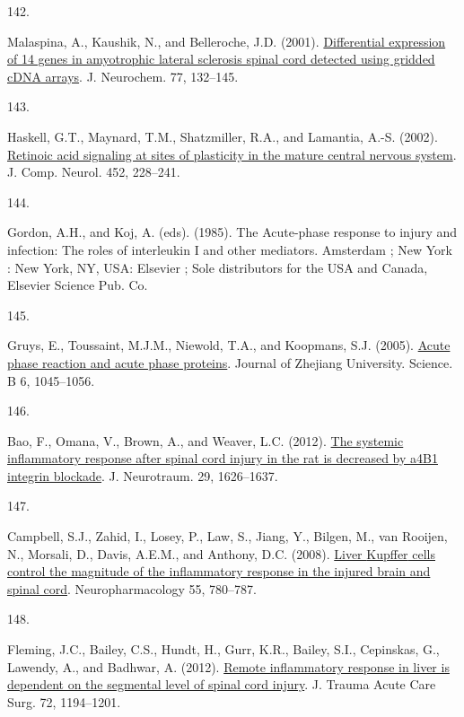 \documentclass[
]{article}
\newlength{\cslhangindent}
\newlength{\csllabelwidth}
\newlength{\cslentryspacingunit} %
\newenvironment{CSLReferences}[2] %
 {%
  \setlength{\parindent}{0pt}
  \ifodd #1
  \let\oldpar\par
  \def\par{\hangindent=\cslhangindent\oldpar}
  \fi
  \setlength{\parskip}{#2\cslentryspacingunit}
 }%
 {}
\newcommand{\CSLLeftMargin}[1]{\parbox[t]{\csllabelwidth}{#1}}
\newcommand{\CSLRightInline}[1]{\parbox[t]{\linewidth - \csllabelwidth}{#1}\break}
\begin{document}
\begin{CSLReferences}{0}{0}
\leavevmode{}%
\CSLLeftMargin{142. }
\CSLRightInline{Malaspina, A., Kaushik, N., and Belleroche, J.D. (2001). \href{https://doi.org/10.1046/j.1471-4159.2001.00231.x}{Differential expression of 14 genes in amyotrophic lateral sclerosis spinal cord detected using gridded {cDNA} arrays}. J. Neurochem. 77, 132--145.}

\leavevmode{}%
\CSLLeftMargin{143. }
\CSLRightInline{Haskell, G.T., Maynard, T.M., Shatzmiller, R.A., and Lamantia, A.-S. (2002). \href{https://doi.org/10.1002/cne.10369}{Retinoic acid signaling at sites of plasticity in the mature central nervous system}. J. Comp. Neurol. 452, 228--241.}

\leavevmode{}%
\CSLLeftMargin{144. }
\CSLRightInline{Gordon, A.H., and Koj, A. (eds). (1985). The {Acute-phase} response to injury and infection: The roles of interleukin {I} and other mediators. {Amsterdam ; New York : New York, NY, USA}: {Elsevier ; Sole distributors for the USA and Canada, Elsevier Science Pub. Co}.}

\leavevmode{}%
\CSLLeftMargin{145. }
\CSLRightInline{Gruys, E., Toussaint, M.J.M., Niewold, T.A., and Koopmans, S.J. (2005). \href{https://doi.org/10.1631/jzus.2005.B1045}{Acute phase reaction and acute phase proteins}. Journal of Zhejiang University. Science. B 6, 1045--1056.}

\leavevmode{}%
\CSLLeftMargin{146. }
\CSLRightInline{Bao, F., Omana, V., Brown, A., and Weaver, L.C. (2012). \href{https://doi.org/10.1089/neu.2011.2190}{The systemic inflammatory response after spinal cord injury in the rat is decreased by {a4B1} integrin blockade}. J. Neurotraum. 29, 1626--1637.}

\leavevmode{}%
\CSLLeftMargin{147. }
\CSLRightInline{Campbell, S.J., Zahid, I., Losey, P., Law, S., Jiang, Y., Bilgen, M., van Rooijen, N., Morsali, D., Davis, A.E.M., and Anthony, D.C. (2008). \href{https://doi.org/10.1016/j.neuropharm.2008.06.074}{Liver {Kupffer} cells control the magnitude of the inflammatory response in the injured brain and spinal cord}. Neuropharmacology 55, 780--787.}

\leavevmode{}%
\CSLLeftMargin{148. }
\CSLRightInline{Fleming, J.C., Bailey, C.S., Hundt, H., Gurr, K.R., Bailey, S.I., Cepinskas, G., Lawendy, A., and Badhwar, A. (2012). \href{https://doi.org/10.1097/ta.0b013e31824d68bd}{Remote inflammatory response in liver is dependent on the segmental level of spinal cord injury}. J. Trauma Acute Care Surg. 72, 1194--1201.}


\end{CSLReferences}
\end{document}
